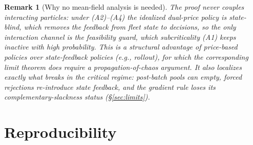 \documentclass[11pt]{article}
\newtheorem{remark}{Remark}
\begin{document}
\begin{remark}[Why no mean-field analysis is needed]
\label{rem:whynochaos}
The proof never couples interacting particles: under (A2)--(A4) the
idealized dual-price policy is state-blind, which removes the feedback
from fleet state to decisions, so the only interaction channel is the
feasibility guard, which subcriticality (A1) keeps inactive with high
probability. This is a
structural advantage of price-based policies over state-feedback
policies (e.g., rollout), for which the corresponding limit theorem
does require a propagation-of-chaos argument. It also localizes
exactly what breaks in the critical regime: post-batch pools can
empty, forced rejections re-introduce state feedback, and the
gradient rule loses its complementary-slackness status
(\S\ref{sec:limits}).
\end{remark}

\section{Reproducibility}
\label{sec:repro}
\end{document}
